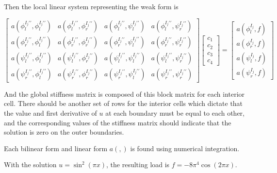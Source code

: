 \documentclass{hw-template}
\begin{document}
Then the local linear system representing the weak form is





\begin{equation}
\begin{bmatrix}
a(\phi^{I_j\prime\prime}_l , \phi^{I_j\prime\prime}_l) & a(\phi^{I_j\prime\prime}_l , \phi^{I_j\prime\prime}_r) & a(\phi^{I_j\prime\prime}_l , \psi^{I_j\prime\prime}_l)& a( \phi^{I_j\prime\prime}_l,\psi^{I_j\prime\prime}_r)\\
a(\phi^{I_j\prime\prime}_r,  \phi^{I_j\prime\prime}_l) & a(\phi^{I_j\prime\prime}_r,  \phi^{I_j\prime\prime}_r) & a( \phi^{I_j\prime\prime}_r ,\psi^{I_j\prime\prime}_l)& a( \phi^{I_j\prime\prime}_r,\psi^{I_j\prime\prime}_r)\\
a(\psi^{I_j\prime\prime}_l,  \phi^{I_j\prime\prime}_l) & a(\psi^{I_j\prime\prime}_l , \phi^{I_j\prime\prime}_r) & a( \psi^{I_j\prime\prime}_l, \psi^{I_j\prime\prime}_l)& a( \psi^{I_j\prime\prime}_l,\psi^{I_j\prime\prime}_r)\\
a(\psi^{I_j\prime\prime}_r,  \phi^{I_j\prime\prime}_l) & a(\psi^{I_j\prime\prime}_r , \phi^{I_j\prime\prime}_r) & a( \psi^{I_j\prime\prime}_r, \psi^{I_j\prime\prime}_l)& a( \psi^{I_j\prime\prime}_r,\psi^{I_j\prime\prime}_r)
\end{bmatrix}
\begin{bmatrix}
    c_1\\
    c_2\\
    c_3\\
    c_4
\end{bmatrix}
= 
\begin{bmatrix}
a(\phi^{I_j}_l , f)\\
a( \phi^{I_j}_r, f)\\
a( \psi^{I_j}_l, f)\\
a( \psi^{I_j}_r, f)
\end{bmatrix}
\end{equation}

And the global stiffness matrix is composed of this block matrix for each interior cell. There should be another set of rows for the interior cells which dictate that the value and first derivative of $u$ at each boundary must be equal to each other, and the corresponding values of the stiffness matrix should indicate that the solution is zero on the outer boundaries.

Each bilinear form and linear form $a(,)$ is found using numerical integration.

With the solution $u = \sin^2(\pi x)$, the resulting load is $f = -8 \pi^4 \cos(2\pi x)$.
\end{document}
